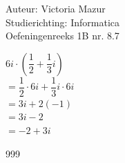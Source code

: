 \documentclass[a4paper]{article}
\begin{document}
  
\noindent \large Auteur: Victoria Mazur \\
\noindent \large Studierichting: Informatica\\
\noindent \large Oefeningenreeks 1B nr. 8.7\\

\medskip

\normalsize

$ 6i \cdot \left( \dfrac{1}{2} + \dfrac{1}{3}i \right)$ \\

$= \dfrac{1}{2} \cdot 6i + \dfrac{1}{3}i \cdot 6i$ \\

$= 3i + 2(-1)$ \\

$= 3i - 2$ \\

$= -2 + 3i $
 
\begin{thebibliography}{999}
\end{thebibliography}
\end{document}
